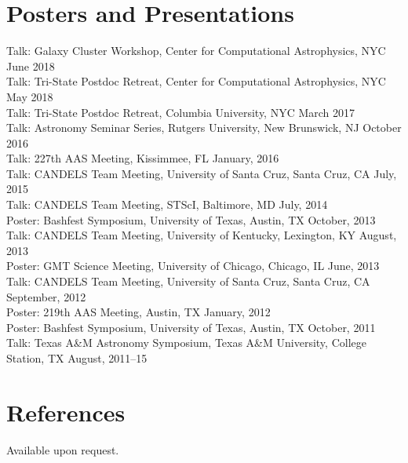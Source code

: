 \documentclass[margin,line, 11pt]{res}
\begin{document}
\begin{resume}
\section{Posters and Presentations}
Talk: Galaxy Cluster Workshop, Center for Computational Astrophysics, NYC June 2018\\
Talk: Tri-State Postdoc Retreat, Center for Computational Astrophysics, NYC May 2018\\
Talk: Tri-State Postdoc Retreat, Columbia University, NYC March 2017\\
Talk: Astronomy Seminar Series, Rutgers University, New Brunswick, NJ October 2016\\
Talk: 227th AAS Meeting, Kissimmee, FL January, 2016\\
Talk: CANDELS Team Meeting, University of Santa Cruz, Santa Cruz, CA July, 2015\\
Talk: CANDELS Team Meeting, STScI, Baltimore, MD July, 2014\\
Poster: Bashfest Symposium, University of Texas, Austin, TX October, 2013\\
Talk: CANDELS Team Meeting, University of Kentucky, Lexington, KY August, 2013\\
Poster: GMT Science Meeting, University of Chicago, Chicago, IL June, 2013\\
Talk: CANDELS Team Meeting, University of Santa Cruz, Santa Cruz, CA September, 2012\\
Poster: 219th AAS Meeting, Austin, TX January, 2012\\
Poster: Bashfest Symposium, University of Texas, Austin, TX October, 2011\\
Talk: Texas A\&M Astronomy Symposium, Texas A\&M University, College Station, TX August, 2011--15\\

\section{References}
Available upon request.


\end{resume}
\end{document}
